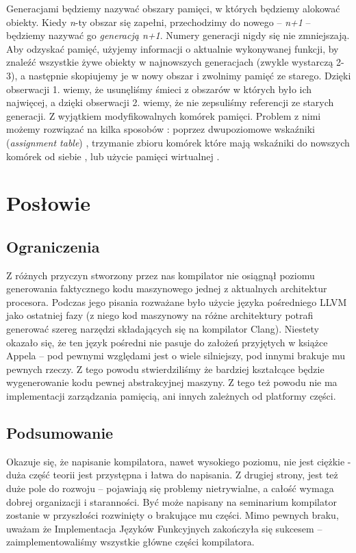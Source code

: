 \documentclass[11pt]{scrartcl}
\begin{document}
Generacjami będziemy nazywać obszary pamięci, w których będziemy alokować
obiekty. Kiedy \textit{n}-ty obszar się zapełni, przechodzimy do nowego -- \textit{n+1} -- będziemy
nazywać go \textit{generacją n+1}. Numery generacji nigdy się nie zmniejszają. Aby
odzyskać pamięć, użyjemy informacji o aktualnie wykonywanej funkcji, by znaleźć
wszystkie żywe obiekty w najnowszych generacjach (zwykle wystarczą 2-3), a
następnie skopiujemy je w nowy obszar i zwolnimy pamięć ze starego. Dzięki
obserwacji 1. wiemy, że usunęliśmy śmieci z obszarów w których było ich
najwięcej, a dzięki obserwacji 2. wiemy, że nie zepsuliśmy referencji ze starych
generacji. Z wyjątkiem modyfikowalnych komórek pamięci. Problem z nimi  możemy
rozwiązać na kilka sposobów \cite[Chapter 16.3: Generational garbage
collection]{Appel}: poprzez dwupoziomowe wskaźniki (\textit{assignment
table}) \cite{Lieberman83}, trzymanie zbioru komórek które mają wskaźniki do nowszych komórek od
siebie \cite{Shaw87}, lub użycie pamięci wirtualnej \cite{Ungar86}.


\section{Posłowie}
\subsection{Ograniczenia}
Z różnych przyczyn stworzony przez nas kompilator nie osiągnął poziomu
generowania faktycznego kodu maszynowego jednej z aktualnych architektur
procesora. Podczas jego pisania rozważane było użycie języka pośredniego LLVM
jako ostatniej fazy (z niego kod maszynowy na różne architektury potrafi
generować szereg narzędzi składających się na kompilator Clang). Niestety
okazało się, że ten język pośredni nie pasuje do założeń przyjętych w książce
Appela -- pod pewnymi względami jest o wiele silniejszy, pod innymi brakuje mu
pewnych rzeczy. Z tego powodu stwierdziliśmy że bardziej kształcące będzie
wygenerowanie kodu pewnej abstrakcyjnej maszyny. Z tego też powodu nie ma
implementacji zarządzania pamięcią, ani innych zależnych od platformy części.

\subsection{Podsumowanie}
Okazuje się, że napisanie kompilatora, nawet wysokiego poziomu, nie jest ciężkie
- duża część teorii jest przystępna i łatwa do napisania. Z drugiej strony, jest
też duże pole do rozwoju -- pojawiają się problemy nietrywialne, a całość
wymaga dobrej organizacji i staranności. Być może napisany na seminarium
kompilator zostanie w przyszłości rozwinięty o brakujące mu części. Mimo pewnych
braku, uważam że Implementacja Języków Funkcyjnych zakończyła się sukcesem --
zaimplementowaliśmy wszystkie główne części kompilatora.



\end{document}
